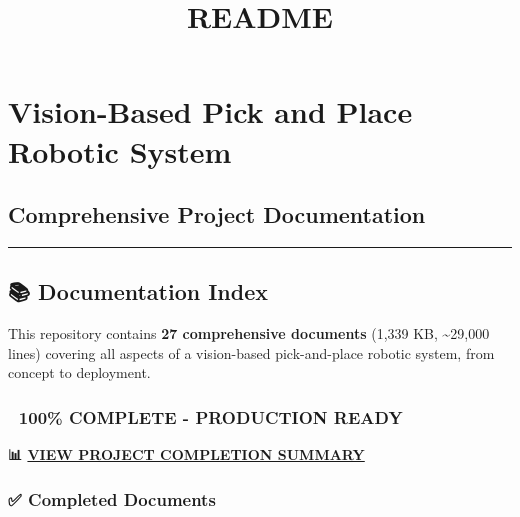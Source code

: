 \documentclass[
]{article}
\title{README}
\author{}
\date{}
\begin{document}
\maketitle

{
\setcounter{tocdepth}{3}
\tableofcontents
}
\hypertarget{vision-based-pick-and-place-robotic-system}{%
\section{Vision-Based Pick and Place Robotic
System}\label{vision-based-pick-and-place-robotic-system}}

\hypertarget{comprehensive-project-documentation}{%
\subsection{Comprehensive Project
Documentation}\label{comprehensive-project-documentation}}

\begin{center}\rule{0.5\linewidth}{0.5pt}\end{center}

\hypertarget{documentation-index}{%
\subsection{📚 Documentation Index}\label{documentation-index}}

This repository contains \textbf{27 comprehensive documents} (1,339 KB,
\textasciitilde29,000 lines) covering all aspects of a vision-based
pick-and-place robotic system, from concept to deployment.

\hypertarget{complete---production-ready}{%
\subsubsection{🎉 100\% COMPLETE - PRODUCTION
READY}\label{complete---production-ready}}

\textbf{📊 \href{./00_PROJECT_COMPLETION_SUMMARY.md}{VIEW PROJECT
COMPLETION SUMMARY}}

\hypertarget{completed-documents}{%
\subsubsection{✅ Completed Documents}\label{completed-documents}}
\end{document}
